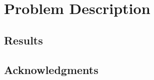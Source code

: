 \documentclass[a4paper, twocolumn, oneside]{book}
\begin{document}
%    

    \vspace{-.4cm}

    \newpage

    \setcounter{secnumdepth}{3}
    \setcounter{tocdepth}{3}
    \tableofcontents
    \thispagestyle{empty}
    \newpage
    \setcounter{page}{1}

    \twocolumn
	\chapter{Problem Description}
	\label{sec:problem}
	
	
	\clearpage
	
	
	
	\clearpage
	
	\clearpage
	\label{sec:scaling}
	
	\clearpage
	
	\clearpage
	\label{sec:evaluation}
	
	\clearpage
	\section{Results}
	\clearpage
	\label{sec:discussion}
    
	\clearpage
	\section{Acknowledgments}
	\label{sec:acknowledgments}

    \onecolumn
    \newpage
    
    
\end{document}
